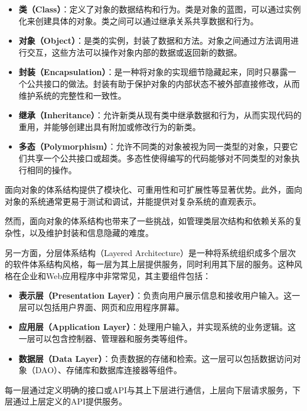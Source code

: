 \begin{itemize}
	\item \textbf{类（Class）}：定义了对象的数据结构和行为。类是对象的蓝图，可以通过实例化来创建具体的对象。类之间可以通过继承关系共享数据和行为。
	
	\item \textbf{对象（Object）}：是类的实例，封装了数据和方法。对象之间通过方法调用进行交互，这些方法可以操作对象内部的数据或返回新的数据。
	
	\item \textbf{封装（Encapsulation）}：是一种将对象的实现细节隐藏起来，同时只暴露一个公共接口的做法。封装有助于保护对象的内部状态不被外部直接修改，从而维护系统的完整性和一致性。
	
	\item \textbf{继承（Inheritance）}：允许新类从现有类中继承数据和行为，从而实现代码的重用，并能够创建出具有附加或修改行为的新类。
	
	\item \textbf{多态（Polymorphism）}：允许不同类的对象被视为同一类型的对象，只要它们共享一个公共接口或超类。多态性使得编写的代码能够对不同类型的对象执行相同的操作。
\end{itemize}

面向对象的体系结构提供了模块化、可重用性和可扩展性等显著优势。此外，面向对象的系统通常更易于测试和调试，并能提供对复杂系统的直观表示。

然而，面向对象的体系结构也带来了一些挑战，如管理类层次结构和依赖关系的复杂性，以及维护封装和信息隐藏的难度。

另一方面，分层体系结构（Layered Architecture）是一种将系统组织成多个层次的软件体系结构风格，每一层为其上层提供服务，同时利用其下层的服务。这种风格在企业和Web应用程序中非常常见，其主要组件包括：

\begin{itemize}
	\item \textbf{表示层（Presentation Layer）}：负责向用户展示信息和接收用户输入。这一层可以包括用户界面、网页和应用程序屏幕。
	
	\item \textbf{应用层（Application Layer）}：处理用户输入，并实现系统的业务逻辑。这一层可以包含控制器、管理器和服务类等组件。
	
	\item \textbf{数据层（Data Layer）}：负责数据的存储和检索。这一层可以包括数据访问对象（DAO）、存储库和数据库连接器等组件。
\end{itemize}

每一层通过定义明确的接口或API与其上下层进行通信，上层向下层请求服务，下层通过上层定义的API提供服务。

